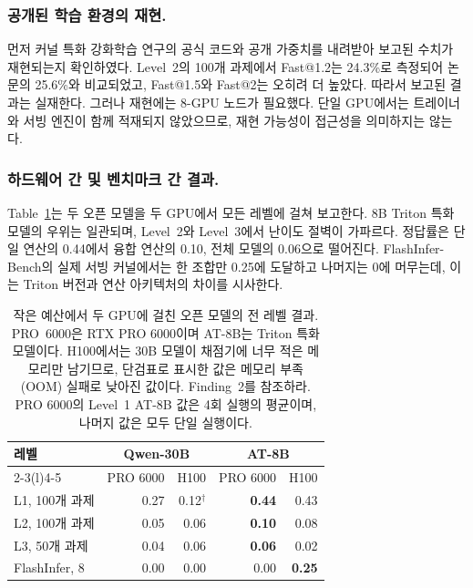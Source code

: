 \documentclass[11pt]{article}
\newcommand{\headrow}[1]{\textbf{#1}}
\begin{document}
\subsubsection{공개된 학습 환경의 재현.}
먼저 커널 특화 강화학습 연구의 공식 코드와 공개 가중치를 내려받아 보고된 수치가 재현되는지
확인하였다. Level~2의 100개 과제에서 Fast@1.2는 24.3\%로 측정되어 논문의 25.6\%와 비교되었고,
Fast@1.5와 Fast@2는 오히려 더 높았다. 따라서 보고된 결과는 실재한다. 그러나 재현에는 8-GPU 노드가
필요했다. 단일 GPU에서는 트레이너와 서빙 엔진이 함께 적재되지 않았으므로, 재현 가능성이 접근성을
의미하지는 않는다.

\subsubsection{하드웨어 간 및 벤치마크 간 결과.}
Table~\ref{tab:rq5}는 두 오픈 모델을 두 GPU에서 모든 레벨에 걸쳐 보고한다. 8B Triton 특화 모델의
우위는 일관되며, Level~2와 Level~3에서 난이도 절벽이 가파르다. 정답률은 단일 연산의 0.44에서 융합
연산의 0.10, 전체 모델의 0.06으로 떨어진다. FlashInfer-Bench의 실제 서빙 커널에서는 한 조합만
0.25에 도달하고 나머지는 0에 머무는데, 이는 Triton 버전과 연산 아키텍처의 차이를 시사한다.

\begin{table}[t]
\centering
\small
\setlength{\tabcolsep}{4pt}
\caption{작은 예산에서 두 GPU에 걸친 오픈 모델의 전 레벨 결과. PRO~6000은 RTX PRO
6000이며 AT-8B는 Triton 특화 모델이다. H100에서는 30B 모델이 채점기에 너무 적은 메모리만 남기므로,
단검표로 표시한 값은 메모리 부족(OOM) 실패로 낮아진 값이다. Finding~2를 참조하라.
PRO 6000의 Level~1 AT-8B 값은 4회 실행의 평균이며, 나머지 값은 모두 단일 실행이다.}
\label{tab:rq5}
\begin{tabular}{@{}lrrrr@{}}
\toprule
\multirow{2}{*}{\headrow{레벨}} & \multicolumn{2}{c}{\headrow{Qwen-30B}} & \multicolumn{2}{c}{\headrow{AT-8B}} \\
\cmidrule(lr){2-3}\cmidrule(l){4-5}
 & PRO 6000 & H100 & PRO 6000 & H100 \\
\midrule
L1, 100개 과제    & 0.27 & 0.12$^{\dagger}$ & \textbf{0.44} & 0.43 \\
L2, 100개 과제    & 0.05 & 0.06 & \textbf{0.10} & 0.08 \\
L3, 50개 과제     & 0.04 & 0.06 & \textbf{0.06} & 0.02 \\
FlashInfer, 8    & 0.00 & 0.00 & 0.00 & \textbf{0.25} \\
\bottomrule
\end{tabular}
\end{table}
\end{document}
